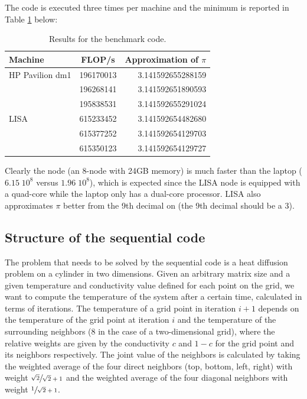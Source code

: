 \documentclass[11pt,a4paper,onecolumn]{article}
\begin{document}
The code is executed three times per machine and the minimum is reported in Table \ref{tab:benchmark} below:

\begin{table}[H]
  \centering
  \begin{tabular}{l | c | r}
    Machine & FLOP/s & Approximation of $\pi$ \\
    \hline
    HP Pavilion dm1 & 196170013 & 3.141592655288159 \\
    & 196268141 & 3.141592651890593 \\
    & 195838531 & 3.141592655291024 \\ 
    LISA & 615233452 & 3.141592654482680 \\
    & 615377252 & 3.141592654129703 \\ 
    & 615350123 & 3.141592654129727 \\
  \end{tabular}
  \caption{Results for the benchmark code.}
  \label{tab:benchmark}
\end{table}

Clearly the node (an 8-node with 24GB memory) is much faster than the laptop ($6.15 \; 10^8$ versus $1.96 \; 10^8$), which is expected since the LISA node is equipped with a quad-core while the laptop only has a dual-core processor. LISA also approximates $\pi$ better from the 9th decimal on (the 9th decimal should be a 3). 

\subsection{Structure of the sequential code}
\label{sec:struc}

The problem that needs to be solved by the sequential code is a heat diffusion problem on a cylinder in two dimensions. Given an arbitrary matrix size and a given temperature and conductivity value defined for each point on the grid, we want to compute the temperature of the system after a certain time, calculated in terms of iterations. The temperature of a grid point in iteration $i+1$ depends on the temperature of the grid point at iteration $i$ and the temperature of the surrounding neighbors (8 in the case of a two-dimensional grid), where the relative weights are given by the conductivity $c$ and $1-c$ for the grid point and its neighbors respectively. The joint value of the neighbors is calculated by taking the weighted average of the four direct neighbors (top, bottom, left, right) with weight $\sfrac{\sqrt{2}}{\sqrt{2}+1}$ and the weighted average of the four diagonal neighbors with weight $\sfrac{1}{\sqrt{2}+1}$.
\end{document}
